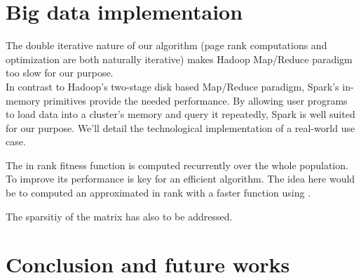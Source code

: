 \documentclass{iSWAGArticle}
\begin{document}
\section{Big data implementaion}
The double iterative nature of our algorithm (page rank computations and optimization are both naturally iterative)
makes Hadoop Map/Reduce paradigm too slow for our purpose. 
\\\newline
In contrast to Hadoop's two-stage disk based Map/Reduce paradigm, Spark's in-memory primitives provide the needed performance.
By allowing user programs to load data into a cluster's memory and query it repeatedly, Spark is well suited for our purpose.
We'll detail the technological implementation of a real-world use case.



The in rank fitness function is computed recurrently over the whole population. To improve its performance is key for an efficient
algorithm. The idea here would be to computed an approximated in rank with a faster function using \cite{}.

The sparsitiy of the matrix has also to be addressed.

\section{Conclusion and future works}

\nocite{*}


\end{document}

